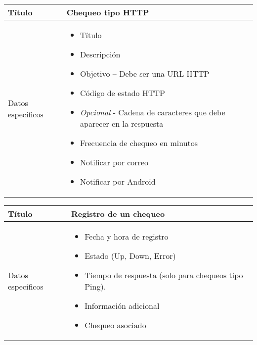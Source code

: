 \begin{center}
  
  \begin{tabularx}{\textwidth}{|l|X|}
    \hline

    Título & Chequeo tipo HTTP \\

    \hline
    Datos específicos &

    \begin{itemize}
      \item Título 
      \item Descripción
      \item Objetivo -- Debe ser una \ac{URL} \ac{HTTP}
      \item Código de estado HTTP
      \item \textit{Opcional} - Cadena de caracteres que debe aparecer en la respuesta
      \item Frecuencia de chequeo en minutos
      \item Notificar por correo
      \item Notificar por Android
    \end{itemize}
    \\
    
    \hline
    
  \end{tabularx}
\end{center}

\begin{center}
  
  \begin{tabularx}{\textwidth}{|l|X|}
    \hline

    Título & Registro de un chequeo \\

    \hline
    Datos específicos &

    \begin{itemize}
    \item Fecha y hora de registro
    \item Estado (Up, Down, Error)
    \item Tiempo de respuesta (solo para chequeos tipo Ping).
    \item Información adicional
    \item Chequeo asociado
    \end{itemize}
    \\
    
    \hline
    
  \end{tabularx}
\end{center}

